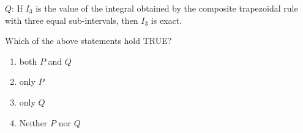 \documentclass[journal]{IEEEtran}
\begin{document}
\begin{enumerate}
    $Q$: If $I_3$ is the value of the integral obtained by the composite trapezoidal rule with three equal sub-intervals, then $I_3$ is exact.

    Which of the above statements hold TRUE?  

    \begin{enumerate}
        \item both $P$ and $Q$
        \item only $P$
        \item only $Q$
        \item Neither $P$ nor $Q$
    \end{enumerate}

\end{enumerate}
\end{document}
